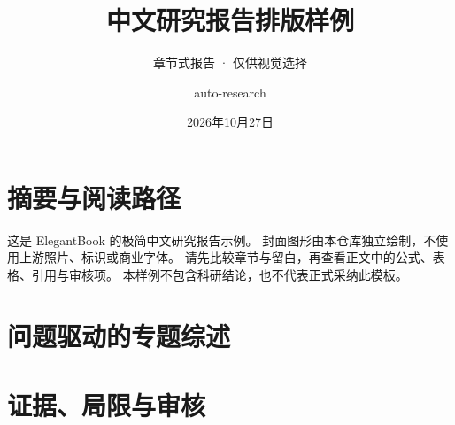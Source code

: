 \documentclass[lang=cn,chinesefont=nofont,bibend=bibtex,a4paper,11pt,device=normal]{elegantbook}
\title{中文研究报告排版样例}
\author{auto-research}
\date{2026年10月27日}
\subtitle{章节式报告 · 仅供视觉选择}
\begin{document}
\maketitle
\frontmatter
\chapter*{摘要与阅读路径}
这是 ElegantBook 的极简中文研究报告示例。
封面图形由本仓库独立绘制，不使用上游照片、标识或商业字体。
请先比较章节与留白，再查看正文中的公式、表格、引用与审核项。
本样例不包含科研结论，也不代表正式采纳此模板。
\tableofcontents
\mainmatter
\chapter{问题驱动的专题综述}

\chapter{证据、局限与审核}

\printbibliography[heading=bibintoc,title={参考文献}]
\end{document}
